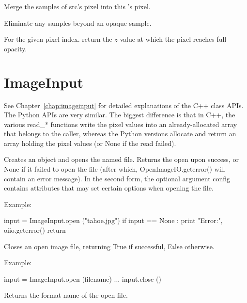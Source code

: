 Merge the samples of {\cf src}'s pixel into this \DeepData's pixel.
\apiend

Eliminate any samples beyond an opaque sample.
\apiend

For the given pixel index. return the $z$ value at which the pixel reaches
full opacity.
\apiend



\section{ImageInput}
\label{sec:pythonimageinput}

See Chapter~\ref{chap:imageinput} for detailed explanations of the
C++ \ImageInput class APIs. The Python APIs are very similar. The biggest
difference is that in C++, the various {\cf read_*} functions write the
pixel values into an already-allocated array that belongs to the caller,
whereas the Python versions allocate and return an array holding the pixel
values (or {\cf None} if the read failed).


Creates an \ImageInput object and opens the named file.  Returns the
open \ImageInput upon success, or {\cf None} if it failed to open the
file (after which, {\cf OpenImageIO.geterror()} will contain an error
message).  In the second form, the optional \ImageSpec argument 
{\cf config} contains attributes that may set certain options when opening
the file.

\noindent Example:
\begin{code}
    input = ImageInput.open ("tahoe.jpg")
    if input == None :
        print "Error:", oiio.geterror()
        return
\end{code}
\apiend

Closes an open image file, returning {\cf True} if successful, {\cf False}
otherwise.

\noindent Example:
\begin{code}
    input = ImageInput.open (filename)
    ...
    input.close ()
\end{code}
\apiend


Returns the format name of the open file.

